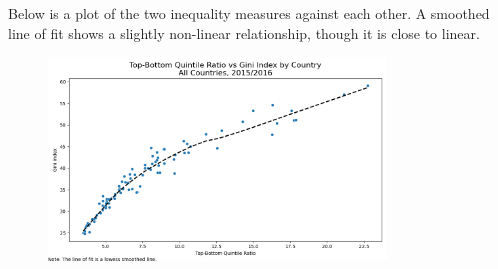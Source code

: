 \documentclass[12pt]{article}
\begin{document}
\begin{enumerate}
    Below is a plot of the two inequality measures against each other. A smoothed line of fit shows a slightly non-linear relationship, though it is close to linear.
    \begin{figure}[H]
        \centering
        \includegraphics[width=0.8\textwidth]{./output/Scatterplot Top-Bottom Quintile Ratio vs Gini Index.png}
    \end{figure}
\end{enumerate}
\end{document}
